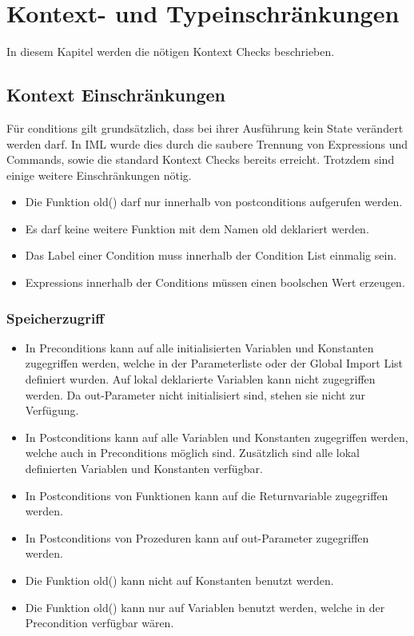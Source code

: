 \section{Kontext- und Typeinschränkungen}
\label{sec:constraints}
In diesem Kapitel werden die nötigen Kontext Checks beschrieben.

\subsection{Kontext Einschränkungen}

Für conditions gilt grundsätzlich, dass bei ihrer Ausführung kein State verändert werden 
darf. In IML wurde dies durch die saubere Trennung von Expressions und Commands, sowie die standard
Kontext Checks bereits erreicht. Trotzdem sind einige weitere Einschränkungen nötig.

\begin{itemize}

\item Die Funktion old() darf nur innerhalb von postconditions aufgerufen werden.
\item Es darf keine weitere Funktion mit dem Namen old deklariert werden.
\item Das Label einer Condition muss innerhalb der Condition List einmalig sein.
\item Expressions innerhalb der Conditions müssen einen boolschen Wert erzeugen.

\end{itemize}

\subsubsection{Speicherzugriff}

\begin{itemize}
\item In Preconditions kann auf alle initialisierten Variablen und Konstanten zugegriffen werden, welche 
in der Parameterliste oder der Global Import List definiert wurden. Auf lokal deklarierte Variablen 
kann nicht zugegriffen werden. Da out-Parameter nicht initialisiert sind, stehen sie nicht zur
Verfügung.
\item In Postconditions kann auf alle Variablen und Konstanten zugegriffen werden, welche auch in 
Preconditions möglich sind. Zusätzlich sind alle lokal definierten Variablen und Konstanten verfügbar.
\item In Postconditions von Funktionen kann auf die Returnvariable zugegriffen werden.
\item In Postconditions von Prozeduren kann auf out-Parameter zugegriffen werden.
\item Die Funktion old() kann nicht auf Konstanten benutzt werden.
\item Die Funktion old() kann nur auf Variablen benutzt werden, welche in der Precondition verfügbar wären.

\end{itemize}



